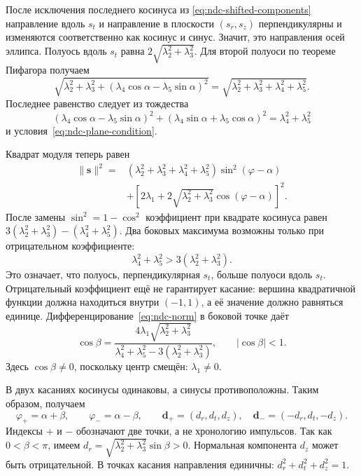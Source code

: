 После исключения последнего косинуса из
\eqref{eq:ndc-shifted-components} направление вдоль $s_t$
и направление в плоскости $(s_r,s_z)$ перпендикулярны и изменяются
соответственно как косинус и синус. Значит, это направления
осей эллипса. Полуось вдоль $s_t$ равна
$2\sqrt{\lambda_2^2+\lambda_3^2}$.
Для второй полуоси по теореме Пифагора получаем
\[
 \sqrt{\lambda_2^2+\lambda_3^2+
       (\lambda_4\cos\alpha-\lambda_5\sin\alpha)^2}
 =\sqrt{\lambda_2^2+\lambda_3^2+\lambda_4^2+\lambda_5^2}.
\]
Последнее равенство следует из тождества
\[
 (\lambda_4\cos\alpha-\lambda_5\sin\alpha)^2+
 (\lambda_4\sin\alpha+\lambda_5\cos\alpha)^2
 =\lambda_4^2+\lambda_5^2
\]
и условия~\eqref{eq:ndc-plane-condition}.

Квадрат модуля теперь равен
\begin{equation}
\begin{aligned}
 \|\boldsymbol s\|^2={}&
 (\lambda_2^2+\lambda_3^2+\lambda_4^2+\lambda_5^2)
                         \sin^2(\varphi-\alpha)\\
 &+\left[2\lambda_1+2\sqrt{\lambda_2^2+\lambda_3^2}
                         \cos(\varphi-\alpha)\right]^2.
\end{aligned}
\label{eq:ndc-norm}
\end{equation}
После замены $\sin^2=1-\cos^2$ коэффициент при квадрате
косинуса равен $3(\lambda_2^2+\lambda_3^2)-(\lambda_4^2+\lambda_5^2)$.
Два боковых максимума возможны только при отрицательном коэффициенте:
\begin{equation}
 \boxed{\lambda_4^2+\lambda_5^2>3(\lambda_2^2+\lambda_3^2).}
 \label{eq:ndc-axes-condition}
\end{equation}
Это означает, что полуось, перпендикулярная $s_t$, больше полуоси
вдоль $s_t$. Отрицательный коэффициент ещё не гарантирует касание:
вершина квадратичной функции должна находиться внутри $(-1,1)$,
а её значение должно равняться единице.
Дифференцирование~\eqref{eq:ndc-norm} в боковой точке даёт
\begin{equation}
 \cos\beta=
 \frac{4\lambda_1\sqrt{\lambda_2^2+\lambda_3^2}}
      {\lambda_4^2+\lambda_5^2-3(\lambda_2^2+\lambda_3^2)},
 \qquad |\cos\beta|<1.
 \label{eq:ndc-contact-angle}
\end{equation}
Здесь $\cos\beta\ne0$, поскольку центр смещён: $\lambda_1\ne0$.

В двух касаниях косинусы одинаковы, а синусы противоположны.
Таким образом, получаем
\begin{equation}
 \varphi_+=\alpha+\beta,\qquad\varphi_-=\alpha-\beta,
 \qquad
 \boldsymbol d_+=(d_r,d_t,d_z),\quad
 \boldsymbol d_-=(-d_r,d_t,-d_z).
 \label{eq:ndc-symmetry}
\end{equation}
Индексы $+$ и $-$ обозначают две точки, а не хронологию импульсов.
Так как $0<\beta<\pi$, имеем
$d_r=\sqrt{\lambda_2^2+\lambda_3^2}\sin\beta>0$.
Нормальная компонента $d_z$ может быть отрицательной.
В точках касания направления единичны:
$d_r^2+d_t^2+d_z^2=1$.

